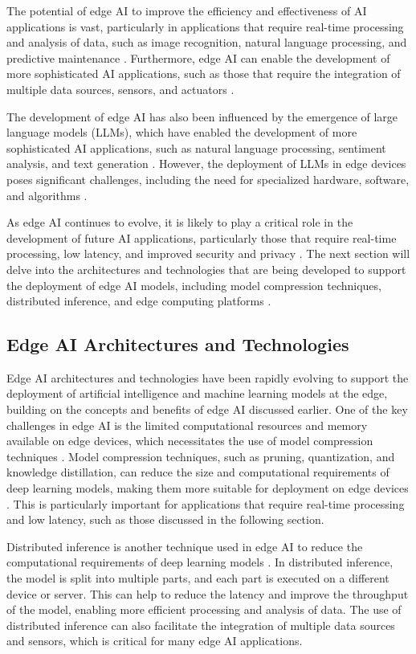 \documentclass[11pt]{article}
\begin{document}
The potential of edge AI to improve the efficiency and effectiveness of AI applications is vast, particularly in applications that require real-time processing and analysis of data, such as image recognition, natural language processing, and predictive maintenance \cite{ref58}. Furthermore, edge AI can enable the development of more sophisticated AI applications, such as those that require the integration of multiple data sources, sensors, and actuators \cite{ref89}.

The development of edge AI has also been influenced by the emergence of large language models (LLMs), which have enabled the development of more sophisticated AI applications, such as natural language processing, sentiment analysis, and text generation \cite{ref90}. However, the deployment of LLMs in edge devices poses significant challenges, including the need for specialized hardware, software, and algorithms \cite{ref91}.

As edge AI continues to evolve, it is likely to play a critical role in the development of future AI applications, particularly those that require real-time processing, low latency, and improved security and privacy \cite{ref85}. The next section will delve into the architectures and technologies that are being developed to support the deployment of edge AI models, including model compression techniques, distributed inference, and edge computing platforms \cite{ref92}.

\subsection{Edge AI Architectures and Technologies}

Edge AI architectures and technologies have been rapidly evolving to support the deployment of artificial intelligence and machine learning models at the edge, building on the concepts and benefits of edge AI discussed earlier. One of the key challenges in edge AI is the limited computational resources and memory available on edge devices, which necessitates the use of model compression techniques \cite{ref93}. Model compression techniques, such as pruning, quantization, and knowledge distillation, can reduce the size and computational requirements of deep learning models, making them more suitable for deployment on edge devices \cite{ref94}. This is particularly important for applications that require real-time processing and low latency, such as those discussed in the following section.

Distributed inference is another technique used in edge AI to reduce the computational requirements of deep learning models \cite{ref95}. In distributed inference, the model is split into multiple parts, and each part is executed on a different device or server. This can help to reduce the latency and improve the throughput of the model, enabling more efficient processing and analysis of data. The use of distributed inference can also facilitate the integration of multiple data sources and sensors, which is critical for many edge AI applications.
\end{document}
